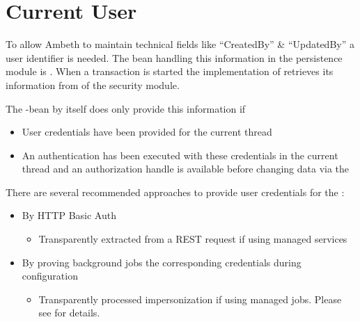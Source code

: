 \section{Current User}
\label{feature:CurrentUser}
\ClearAPI
To allow Ambeth to maintain technical fields like ``CreatedBy'' \& ``UpdatedBy'' a user identifier is needed. The bean handling this information in the persistence module is . When a transaction is started the implementation of  retrieves its information from  of the security module.

The \type{ISecurityContextHolder]}-bean by itself does only provide this information if
\begin{itemize}
	\item User credentials have been provided for the current thread
	\item An authentication has been executed with these credentials in the current thread and an authorization handle is available before changing data via the 
\end{itemize}

There are several recommended approaches to provide user credentials for the :
\begin{itemize}
	\item By HTTP Basic Auth
		\begin{itemize}
			\item Transparently extracted from a REST request if using \AMBETH{} managed services
		\end{itemize}
	\item By proving background jobs the corresponding credentials during configuration
		\begin{itemize}
			\item Transparently processed impersonization if using \AMBETH{} managed jobs. Please see  for details.
		\end{itemize}
\end{itemize}

